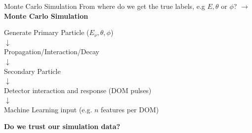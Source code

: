 \begin{frame}{Monte Carlo Simulation}
    From where do we get the true labels, e.g $E, \theta$ or $\phi$?
    $\rightarrow$ \textbf{Monte Carlo Simulation} \\
    \vspace{1em}
    \begin{center}
        Generate Primary Particle ($E_\nu, \theta, \phi$)\\
        $\downarrow$\\
        Propagation/Interaction/Decay
        \\$\downarrow$\\
            Secondary Particle
            \\$\downarrow$\\
        Detector interaction and response (DOM pulses)
        \\$\downarrow$\\
            Machine Learning input (e.g. $n$ features per DOM)
    \end{center}
    \pause
    \textbf{Do we trust our simulation data?}
\end{frame}